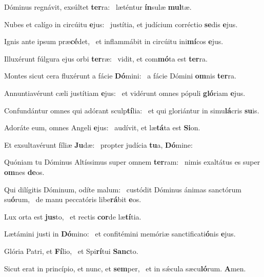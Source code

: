\item Dóminus regnávit, exsúltet \textbf{ter}ra:~\psstar{} læténtur \textbf{ín}sulæ \textbf{mul}tæ.
\item Nubes et calígo in circúitu \textbf{e}jus:~\psstar{} justítia, et judícium corréctio \textbf{se}dis \textbf{e}jus.
\item Ignis ante ipsum præ\textbf{cé}det,~\psstar{} et inflammábit in circúitu ini\textbf{mí}cos \textbf{e}jus.
\item Illuxérunt fúlgura ejus orbi \textbf{ter}ræ:~\psstar{} vidit, et com\textbf{mó}ta est \textbf{ter}ra.
\item Montes sicut cera fluxérunt a fácie \textbf{Dó}mini:~\psstar{} a fácie Dómini \textbf{om}nis \textbf{ter}ra.
\item Annuntiavérunt cæli justítiam \textbf{e}jus:~\psstar{} et vidérunt omnes pópuli \textbf{gló}riam \textbf{e}jus.
\item Confundántur omnes qui adórant sculp\textbf{tí}lia:~\psstar{} et qui gloriántur in simu\textbf{lá}cris \textbf{su}is.
\item Adoráte eum, omnes Angeli \textbf{e}jus:~\psstar{} audívit, et læ\textbf{tá}ta est \textbf{Si}on.
\item Et exsultavérunt fíliæ \textbf{Ju}dæ:~\psstar{} propter judícia \textbf{tu}a, \textbf{Dó}mine:
\item Quóniam tu Dóminus Altíssimus super omnem \textbf{ter}ram:~\psstar{} nimis exaltátus es super \textbf{om}nes \textbf{de}os.
\item Qui dilígitis Dóminum, odíte malum:~\pscross{} custódit Dóminus ánimas sanctórum su\textbf{ó}rum,~\psstar{} de manu peccatóris libe\textbf{rá}bit \textbf{e}os.
\item Lux orta est \textbf{jus}to,~\psstar{} et rectis \textbf{cor}de læ\textbf{tí}tia.
\item Lætámini justi in \textbf{Dó}mino:~\psstar{} et confitémini memóriæ sanctificati\textbf{ó}nis \textbf{e}jus.
\item Glória Patri, et \textbf{Fí}lio,~\psstar{} et Spi\textbf{rí}tui \textbf{Sanc}to.
\item Sicut erat in princípio, et nunc, et \textbf{sem}per,~\psstar{} et in sǽcula sæcu\textbf{ló}rum. \textbf{A}men.
